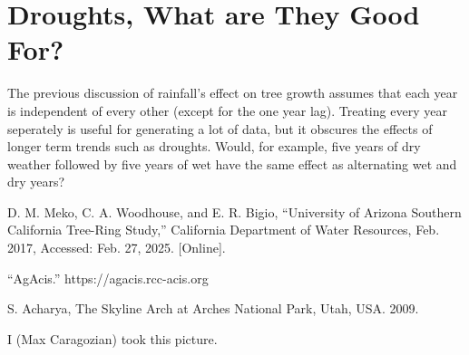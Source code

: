\documentclass[]{article}
\begin{document}
\section{Droughts, What are They Good For?}
The previous discussion of rainfall's effect on tree growth assumes that each year is independent of every other (except for the one year lag). Treating every year seperately is useful for generating a lot of data, but it obscures the effects of longer term trends such as droughts. Would, for example, five years of dry weather followed by five years of wet have the same effect as alternating wet and dry years? 






\begin{thebibliography}{9}
	D. M. Meko, C. A. Woodhouse, and E. R. Bigio, “University of Arizona
	Southern California Tree-Ring Study,” California Department of Water Resources, Feb. 2017, Accessed: Feb. 27, 2025. [Online].
	
	“AgAcis.” https://agacis.rcc-acis.org
	
	S. Acharya, The Skyline Arch at Arches National Park, Utah, USA. 2009.
	
	I (Max Caragozian) took this picture.
\end{thebibliography}
\end{document}
